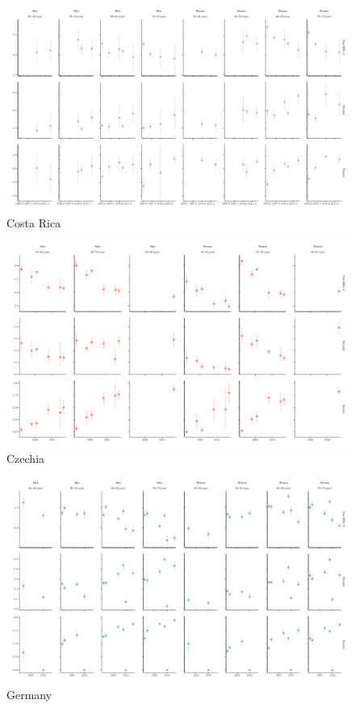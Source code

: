 \documentclass[12pt]{article}
\begin{document}
\begin{appendix}
\begin{landscape}
        \begin{figure}[H]
            \centering
            \includegraphics[width=\linewidth]{../3_figures/countries/fig_costa rica.pdf}
            \caption{Costa Rica}
            \label{fig:costa_rica}
        \end{figure}
    
        \begin{figure}[H]
            \centering
            \includegraphics[width=\linewidth]{../3_figures/countries/fig_czechia.pdf}
            \caption{Czechia}
            \label{fig:czechia}
        \end{figure}

        \begin{figure}[H]
            \centering
            \includegraphics[width=\linewidth]{../3_figures/countries/fig_germany.pdf}
            \caption{Germany}
            \label{fig:germany}
        \end{figure}


\end{landscape}
\end{appendix}
\end{document}
